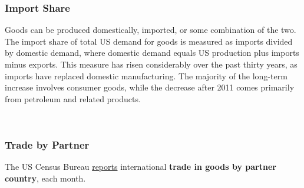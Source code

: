 \subsubsection*{Import Share} 
\begin{minipage}{0.76\textwidth}  
\small Goods can be produced domestically, imported, or some combination of the two. The import share of total US demand for goods is measured as imports divided by domestic demand, where domestic demand equals US production plus imports minus exports. This measure has risen considerably over the past thirty years, as imports have replaced domestic manufacturing. The majority of the long-term increase involves consumer goods, while the decrease after 2011 comes primarily from petroleum and related products. 

 


\vspace{1mm}

\\
\end{minipage}
\newpage


\subsubsection*{Trade by Partner} 
\begin{minipage}{0.76\textwidth} 
\small The US Census Bureau \href{https://www.census.gov/foreign-trade/data/index.html}{reports} international \textbf{trade in goods by partner country}, each month.  
\end{minipage}
\vspace{1mm}

